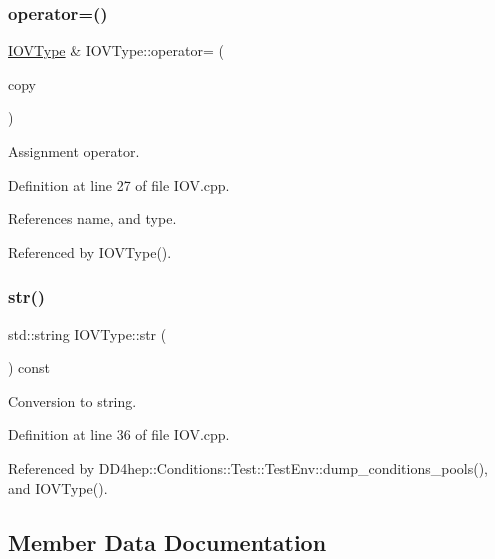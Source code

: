 \subsubsection{\texorpdfstring{operator=()}{operator=()}}
{\footnotesize\ttfamily \hyperlink{class_d_d4hep_1_1_i_o_v_type}{I\+O\+V\+Type} \& I\+O\+V\+Type\+::operator= (\begin{DoxyParamCaption}\item[{const \hyperlink{class_d_d4hep_1_1_i_o_v_type}{I\+O\+V\+Type} \&}]{copy }\end{DoxyParamCaption})}



Assignment operator. 



Definition at line 27 of file I\+O\+V.\+cpp.



References name, and type.



Referenced by I\+O\+V\+Type().

\hypertarget{class_d_d4hep_1_1_i_o_v_type_aaa285e7ab61a0beb5613f2413d4acbf2}{}\label{class_d_d4hep_1_1_i_o_v_type_aaa285e7ab61a0beb5613f2413d4acbf2} 
\subsubsection{\texorpdfstring{str()}{str()}}
{\footnotesize\ttfamily std\+::string I\+O\+V\+Type\+::str (\begin{DoxyParamCaption}{ }\end{DoxyParamCaption}) const}



Conversion to string. 



Definition at line 36 of file I\+O\+V.\+cpp.



Referenced by D\+D4hep\+::\+Conditions\+::\+Test\+::\+Test\+Env\+::dump\+\_\+conditions\+\_\+pools(), and I\+O\+V\+Type().



\subsection{Member Data Documentation}
\hypertarget{class_d_d4hep_1_1_i_o_v_type_a065ca1030c72dec59bd0c6533acaa1da}{}\label{class_d_d4hep_1_1_i_o_v_type_a065ca1030c72dec59bd0c6533acaa1da} 

